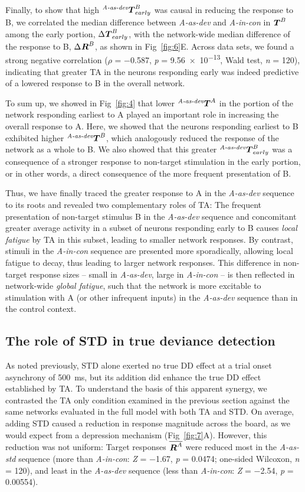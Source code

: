 \documentclass[10pt,letterpaper]{article}
\newcommand{\dev}{\textit{A-as-dev}}
\newcommand{\msc}{\textit{A-in-con}}
\newcommand{\std}{\textit{A-as-std}}
\newcommand{\ifstringequal}[4]{%
  \ifnum\pdfstrcmp{#1}{#2}=0
  #3%
  \else
  #4%
  \fi
}
\newcommand{\seqreplace}[1]{\ifstringequal{dev}{#1}{\dev}{%
    \ifstringequal{std}{#1}{\std}{%
        \ifstringequal{msc}{#1}{\msc}{#1}%
    }%
}}
\newcommand{\R}[3][]{{}^{\seqreplace{#1}}_{}\boldsymbol R^{#2}_{#3}}
\newcommand{\T}[3][]{{}^{\seqreplace{#1}}_{}\boldsymbol T^{#2}_{#3}}
\newcommand{\mean}[1]{\overline{#1}}
\newcommand{\FIG}[1]{Fig~\ref{fig:#1}}
\newcommand{\statistic}[2]{\textit{#1} = \num{#2}}
\begin{document}
Finally, to show that high $\T[dev]{B}{early}$ was causal in reducing the response to B, we correlated the median difference between \dev{} and \msc{} in $\T{B}{}$ among the early portion, $\Delta \T{B}{early}$, with the network-wide median difference of the response to B, $\Delta \R{B}{}$, as shown in \FIG{6}E. Across data sets, we found a strong negative correlation ($\rho$ = \num{-0.587}, \statistic{p}{9.56e-13}, Wald test, \statistic{n}{120}), indicating that greater TA in the neurons responding early was indeed predictive of a lowered response to B in the overall network.

To sum up, we showed in \FIG{4} that lower $\T[dev]{A}{}$ in the portion of the network responding earliest to A played an important role in increasing the overall response to A. Here, we showed that the neurons responding earliest to B exhibited higher $\T[dev]{B}{}$, which analogously reduced the response of the network as a whole to B. We also showed that this greater $\T[dev]{B}{early}$ was a consequence of a stronger response to non-target stimulation in the early portion, or in other words, a direct consequence of the more frequent presentation of B.

Thus, we have finally traced the greater response to A in the \dev{} sequence to its roots and revealed two complementary roles of TA: The frequent presentation of non-target stimulus B in the \dev{} sequence and concomitant greater average activity in a subset of neurons responding early to B causes \emph{local fatigue} by TA in this subset, leading to smaller network responses. By contrast, stimuli in the \msc{} sequence are presented more sporadically, allowing local fatigue to decay, thus leading to larger network responses. This difference in non-target response sizes -- small in \dev{}, large in \msc{} -- is then reflected in network-wide \emph{global fatigue}, such that the network is more excitable to stimulation with A (or other infrequent inputs) in the \dev{} sequence than in the control context.

\subsection*{The role of STD in true deviance detection}

As noted previously, STD alone exerted no true DD effect at a trial onset asynchrony of \qty{500}{\milli\second}, but its addition did enhance the true DD effect established by TA. To understand the basis of this apparent synergy, we contrasted the TA only condition examined in the previous section against the same networks evaluated in the full model with both TA and STD. On average, adding STD caused a reduction in response magnitude across the board, as we would expect from a depression mechanism (\FIG{7}A). However, this reduction was not uniform: Target responses $\mean{\R{A}{}}$ were reduced most in the \std{} sequence (more than \msc{}: \statistic{Z}{-1.67}, \statistic{p}{0.0474}; one-sided Wilcoxon, \statistic{n}{120}), and least in the \dev{} sequence (less than \msc{}: \statistic{Z}{-2.54}, \statistic{p}{0.00554}).
\end{document}
